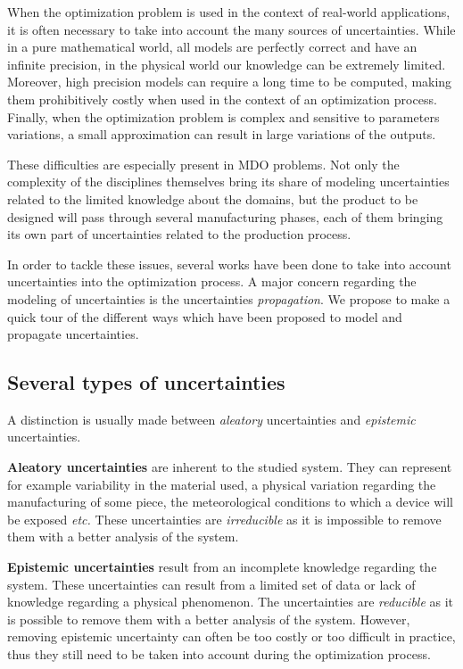 When the optimization problem is used in the context of real-world applications, it is often necessary to take into account the many sources of uncertainties. While in a pure mathematical world, all models are perfectly correct and have an infinite precision, in the physical world our knowledge can be extremely limited. Moreover, high precision models can require a long time to be computed, making them prohibitively costly when used in the context of an optimization process. Finally, when the optimization problem is complex and sensitive to parameters variations, a small approximation can result in large variations of the outputs.

These difficulties are especially present in MDO problems. Not only the complexity of the disciplines themselves bring its share of modeling uncertainties related to the limited knowledge about the domains, but the product to be designed will pass through several manufacturing phases, each of them bringing its own part of uncertainties related to the production process.

In order to tackle these issues, several works have been done to take into account uncertainties into the optimization process. A major concern regarding the modeling of uncertainties is the uncertainties \emph{propagation}. We propose to make a quick tour of the different ways which have been proposed to model and propagate uncertainties.

\subsection{Several types of uncertainties}

A distinction is usually made between \emph{aleatory} uncertainties and \emph{epistemic} uncertainties.

\textbf{Aleatory uncertainties} are inherent to the studied system. They can represent for example variability in the material used, a physical variation regarding the manufacturing of some piece, the meteorological conditions to which a device will be exposed \emph{etc.} These uncertainties are \emph{irreducible} as it is impossible to remove them with a better analysis of the system.

\textbf{Epistemic uncertainties} result from an incomplete knowledge regarding the system. These uncertainties can result from a limited set of data or lack of knowledge regarding a physical phenomenon. The uncertainties are \emph{reducible} as it is possible to remove them with a better analysis of the system. However, removing epistemic uncertainty can often be too costly or too difficult in practice, thus they still need to be taken into account during the optimization process.

